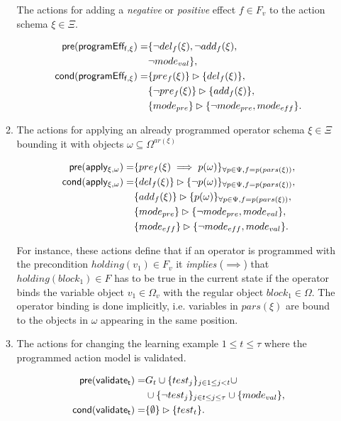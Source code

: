 \documentclass[letterpaper]{article} %
\newcommand{\pre}{\mathsf{pre}}     %
\newcommand{\cond}{\mathsf{cond}}   %
\begin{document}
\begin{itemize}
\begin{enumerate}
The actions for adding a {\em negative} or {\em positive} effect $f\in F_v$ to the action schema $\xi\in\Xi$.

\begin{small}
\begin{align*}
\hspace*{7pt}\pre(\mathsf{programEff_{f,\xi}})=&\{\neg del_{f}(\xi),\neg add_{f}(\xi),\\                                                   
&\neg mode_{val}\},\\
\cond(\mathsf{programEff_{f,\xi}})=&\{pre_{f}(\xi)\}\rhd\{del_{f}(\xi)\},\\
&\{\neg pre_{f}(\xi)\}\rhd\{add_{f}(\xi)\},\\
&\{mode_{pre}\}\rhd\{\neg mode_{pre},mode_{eff}\}.
\end{align*}
\end{small}

\item The actions for applying an already programmed operator schema $\xi\in\Xi$ bounding it with objects $\omega\subseteq\Omega^{ar(\xi)}$
\begin{small}
\begin{align*}
\hspace*{7pt}\pre(\mathsf{apply_{\xi,\omega}})=&\{pre_{f}(\xi)\implies p(\omega)\}_{\forall p\in\Psi,f=p(pars(\xi))},\\
\cond(\mathsf{apply_{\xi,\omega}})=&\{del_{f}(\xi)\}\rhd\{\neg p(\omega)\}_{\forall p\in\Psi,f=p(pars(\xi))},\\
&\{add_{f}(\xi)\}\rhd\{p(\omega)\}_{\forall p\in\Psi,f=p(pars(\xi))},\\
&\{mode_{pre}\}\rhd\{\neg mode_{pre},mode_{val}\},\\
&\{mode_{eff}\}\rhd\{\neg mode_{eff},mode_{val}\}.
\end{align*}
\end{small}

For instance, these actions define that if an operator is programmed with the precondition $holding(v_1)\in F_v$ it {\em implies} ($\implies$) that $holding(block_1)\in F$ has to be true in the current state if the operator binds the variable object $v_1\in\Omega_v$ with the regular object $block_1\in\Omega$. The operator binding is done implicitly, i.e. variables in $pars(\xi)$ are bound to the objects in $\omega$ appearing in the same position. 

\item The actions for changing the learning example {\small $1\leq t\leq \tau$} where the programmed action model is validated. 
\begin{small}
\begin{align*}
\hspace*{7pt}\pre(\mathsf{validate_{t}})=&G_t\cup\{test_j\}_{j\in 1\leq j<t}\cup\\
&\cup\{\neg test_j\}_{j\in t\leq j\leq \tau}\cup \{mode_{val}\},\\
\cond(\mathsf{validate_{t}})=&\{\emptyset\}\rhd\{test_t\}.
\end{align*}
\end{small}
\end{enumerate}
\end{itemize}
\end{document}
